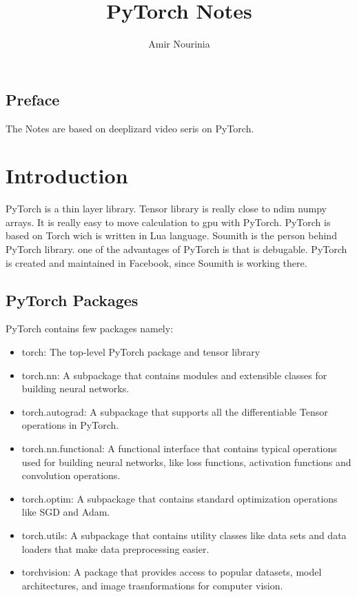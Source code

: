 \documentclass[11pt,twoside,a4paper]{report}
\title{PyTorch Notes}
\author{Amir Nourinia}
\begin{document}
\maketitle
\tableofcontents
\section{Preface}
The Notes are based on deeplizard video seris on PyTorch.
\chapter{Introduction}

PyTorch is a thin layer library. Tensor library is really close to ndim numpy arrays. It is really easy to move calculation to gpu with PyTorch.
PyTorch is based on Torch wich is written in Lua language. Soumith is the person behind PyTorch library. one of the advantages of PyTorch is that is debugable.
PyTorch is created and maintained in Facebook, since Soumith is working there.

\section{PyTorch Packages}
PyTorch contains few packages namely:

\begin{itemize}
    \item torch: The top-level PyTorch package and tensor library
    \item torch.nn: A subpackage that contains modules and extensible classes for building neural networks.
    \item torch.autograd: A subpackage that supports all the differentiable Tensor operations in PyTorch.
    \item torch.nn.functional: A functional interface that contains typical operations used for building neural networks, like loss functions, activation functions and
    convolution operations.
    \item torch.optim: A subpackage that contains standard optimization operations like SGD and Adam.
    \item torch.utils: A subpackage that contains utility classes like data sets and data loaders that make data preprocessing easier.
    \item torchvision: A package that provides access to popular datasets, model architectures, and image trasnformations for computer vision.
\end{itemize}
\end{document}
